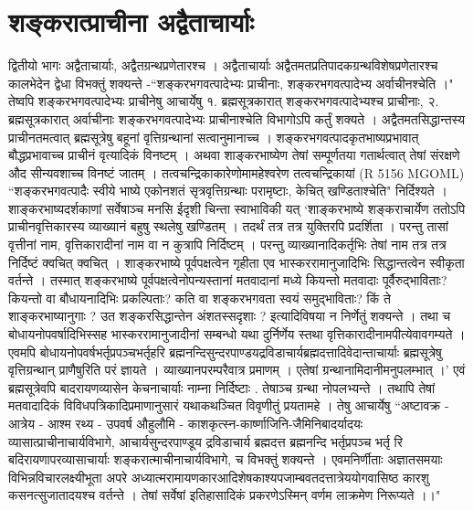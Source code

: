\chapter{शङ्करात्प्राचीना अद्वैताचार्याः}
द्वितीयो भागः
अद्वैताचार्याः, अद्वैतग्रन्थप्रणेतारश्च ।
अद्वैताचार्याः अद्वैतमतप्रतिपादकग्रन्थविशेषप्रणेतारश्च कालभेदेन द्वेधा विभक्तुं शक्यन्ते -``शङ्करभगवत्पादेभ्यः प्राचीनाः, शङ्करभगवत्पादेभ्य अर्वाचीनश्चेति ।" तेष्वपि शङ्करभगवत्पादेभ्यः प्राचीनेषु आचार्येषु १. ब्रह्मसूत्रकारात् शङ्करभगवत्पादेभ्यश्च प्राचीनाः, २. ब्रह्मसूत्रकारात् अर्वाचीनाः शङ्करभगवत्पादेभ्यः प्राचीनाश्चेति विभागोऽपि कर्तुं शक्यते । अद्वैतमतसिद्धान्तस्य प्राचीनतमत्वात् ब्रह्मसूत्रेषु बहूनां वृत्तिग्रन्थानां सत्वानुमानाच्च । शङ्करभगवत्पादकृतभाष्यप्रभावात् बौद्धप्रभावाच्च प्राचीनं वृत्यादिकं विनष्टम् । अथवा शाङ्करभाष्येण तेषां सम्पूर्णतया गतार्थत्वात् तेषां संरक्षणे औद सीन्यवशाच्च विनष्टं जातम् । तत्वचन्द्रिकाकारेणोमामहेश्वरेण तत्वचन्द्रिकायां (R 5156 MGOML) ``शङ्करभगवत्पादैः स्वीये भाष्ये एकोनशतं सृत्रवृत्तिग्रन्थाः परामृष्टाः, केचित् खण्डिताश्चेति" निर्दिश्यते । शाङ्करभाष्यदर्शकाणां सर्वेषाञ्च मनसि ईदृशी चिन्ता स्वाभाविकी यत् `शाङ्करभाष्ये शङ्कराचार्येण ततोऽपि प्राचीनवृत्तिकारस्य व्याख्यानं बहुषु स्थलेषु खण्डितम् । तदर्थं तत्र तत्र युक्तिरपि प्रदर्शिता । परन्तु तासां वृत्तीनां नाम, वृत्तिकारादीनां नाम वा न कुत्रापि निर्दिष्टम् । परन्तु व्याख्यानादिकर्तृभिः तेषां नाम तत्र तत्र निर्दिष्टं क्वचित् क्वचित् । शाङ्करभाष्ये पूर्वपक्षत्वेन गृहीता एव भास्कररामानुजादिभिः सिद्धान्तत्वेन स्वीकृता वर्तन्ते । तस्मात् शङ्करभाष्ये पूर्वपक्षत्वेनोपन्यस्तानां मतवादानां मध्ये कियन्तो मतवादाः पूर्वैरुद्भाविताः? कियन्तो वा बौधायनादिभिः प्रकल्पिताः? कति वा शङ्करभगवता स्वयं समुद्भाविताः? किं ते शाङ्करभाष्यानुगाः ? उत शङ्करसिद्धान्तेन अंशतस्सदृशाः ? इत्यादिविषया न निर्णेतुं शक्यन्ते । तथा च बोधायनोपवर्षादिभिस्सह भास्कररामानुजादीनां सम्बन्धो यथा दुर्निर्णेय स्तथा वृत्तिकारादीनामपीत्येवावगम्यते । एवमपि बोधायनोपवर्षभर्तृप्रपञ्चभर्तृहरि ब्रह्मनन्दिसुन्दरपाण्डयद्रविडाचार्यब्रह्मदत्तादिवेदान्ताचार्याः ब्रह्मसूत्रेषु वृत्तिग्रन्थान् प्राणैषुरिति परं ज्ञायते । व्याख्यानपरम्परैवात्र प्रमाणम् । एतेषां ग्रन्थानामिदानीमनुपलम्भात् ।'
एवं ब्रह्मसूत्रेवपि बादरायणव्यासेन केचनाचार्याः नाम्ना निर्दिष्टाः . तेषाञ्च ग्रन्था नोपलभ्यन्ते । तथापि तेषां मतवादादिकं विविधपत्रिकादिप्रमाणानुसारं यथाकथञ्चित विवृणीतुं प्रयतामहे । तेषु आचार्येषु ``अष्टावक्र - आत्रेय - आश्म रथ्य - उपवर्ष औहुलौमि - काशकृत्स्न-कार्ष्णाजिनि-जैमिनिबादर्यादयः व्यासात्प्राचीनाचार्यविभागे, आचार्यसुन्दरपाण्डूय द्रविडाचार्य ब्रह्मदत्त ब्रह्मनन्दि भर्तृप्रपञ्च भर्तृ रि बदिरायणापरव्यासाचार्याः शङ्करात्माचीनाचार्यविभागे, च विभक्तुं शक्यन्ते । एवमनिर्णीताः अज्ञातसमयाः विभिन्नविचारलक्ष्यीभूता अपरे अध्यात्मरामायणकारआदिशेषकाश्यपजाम्बवतदत्तात्रेययोगवासिष्ठ कारशु कसनत्सुजातादयश्च वर्तन्ते । तेषां सर्वेषां इतिहासादिकं प्रकरणेऽस्मिन् वर्णम लाक्रमेण निरूप्यते ।।"

